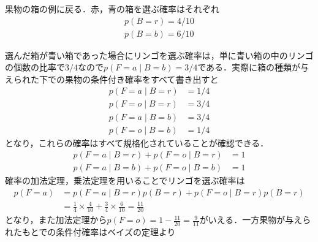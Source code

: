 \documentclass{jsarticle}
\theoremstyle{definition}
\numberwithin{equation}{section}
\begin{document}
果物の箱の例に戻る．赤，青の箱を選ぶ確率はそれぞれ
\begin{align}
p(B = r) = 4/10\\
p(B = b) = 6/10
\end{align}

選んだ箱が青い箱であった場合にリンゴを選ぶ確率は，単に青い箱の中のリンゴの個数の比率で$3/4$なので$p(F = a\mid B = b) = 3/4$である．実際に箱の種類が与えられた下での果物の条件付き確率をすべて書き出すと
\begin{align}
p(F = a\mid B = r) &= 1/4\\
p(F = o\mid B = r) &= 3/4\\
p(F = a\mid B = b) &= 3/4\\
p(F = o\mid B = b) &= 1/4
\end{align}
となり，これらの確率はすべて規格化されていることが確認できる．
\begin{align}
p(F = a\mid B = r) + p(F = o\mid B = r) &= 1\\
p(F = a\mid B = b) + p(F = o\mid B = b) &= 1
\end{align}
確率の加法定理，乗法定理を用いることでリンゴを選ぶ確率は
\begin{equation}
\begin{split}
p(F = a)&=p(F = a\mid B = r)p(B = r) + p(F = o\mid B = r)p(B = r)\\
&=\frac{1}{4} \times \frac{4}{10} + \frac{3}{4}\times \frac{6}{10} = \frac{11}{20}
\end{split}
\end{equation}
となり，また加法定理から$p(F = o) =\displaystyle 1-\frac{11}{20} = \frac{9}{11}$がいえる．一方果物が与えられたもとでの条件付確率はベイズの定理より
\end{document}

